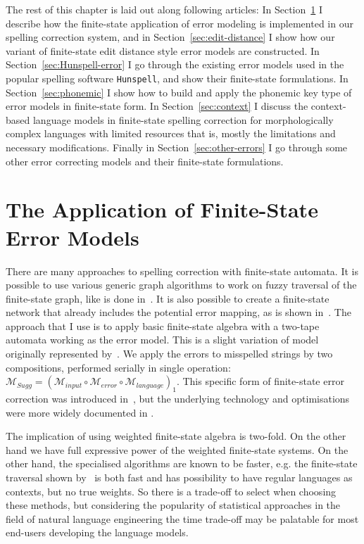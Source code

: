 \documentclass[officiallayout]{unihelcompling}
\begin{document}
The rest of this chapter is laid out along following articles: In
Section~\ref{sec:error-application} I describe how the finite-state application
of error modeling is implemented in our spelling correction system, and in
Section~\ref{sec:edit-distance} I show how our variant of finite-state edit
distance style error models are constructed.  In
Section~\ref{sec:Hunspell-error} I go through the existing error models used in
the popular spelling software \texttt{Hunspell}, and show their finite-state
formulations. In Section~\ref{sec:phonemic} I show how to build and apply
the phonemic key type of error models in finite-state form. 
In Section~\ref{sec:context} I discuss the context-based language models in
finite-state spelling correction for morphologically complex languages with
limited resources that is, mostly the limitations and necessary modifications.
Finally in Section~\ref{sec:other-errors} I go through some other error
correcting models and their finite-state formulations.

\section{The Application of Finite-State Error Models}
\label{sec:error-application}

There are many approaches to spelling correction with finite-state automata.
It is possible to use various generic graph algorithms to work on fuzzy
traversal of the finite-state graph, like is done in~\citet{hulden2009fast}.
It is also possible to create a finite-state network that already includes the
potential error mapping, as is shown in~\citet{schulz2002fast}. The approach
that I use is to apply basic finite-state algebra with a two-tape automata
working as the error model. This is a slight variation of model originally
represented by~\citet{mohri2003edit}. We apply the errors to
misspelled strings by two compositions, performed serially in single operation:
$\mathcal{M}_{Sugg} = (\mathcal{M}_{input} \circ \mathcal{M}_{error} \circ
\mathcal{M}_{language})_1$.  This specific form of finite-state error
correction was introduced in~, but the
underlying technology and optimisations were more widely documented in
\citet{linden2011hfst}.

The implication of using weighted finite-state algebra is two-fold. On the
other hand we have full expressive power of the weighted finite-state systems.
On the other hand, the specialised algorithms are known to be faster, e.g.  the
finite-state traversal shown by~\citet{hulden2009fast} is both fast and has
possibility to have regular languages as contexts, but no true weights. So
there is a trade-off to select when choosing these methods, but considering the
popularity of statistical approaches in the field of natural language
engineering the time trade-off may be palatable for most end-users developing
the language models.
\end{document}
